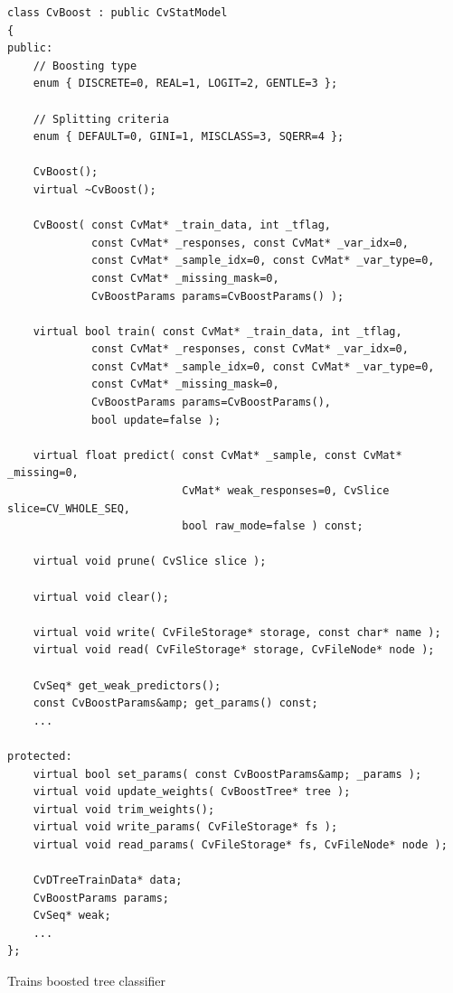 \begin{lstlisting}
class CvBoost : public CvStatModel
{
public:
    // Boosting type
    enum { DISCRETE=0, REAL=1, LOGIT=2, GENTLE=3 };

    // Splitting criteria
    enum { DEFAULT=0, GINI=1, MISCLASS=3, SQERR=4 };

    CvBoost();
    virtual ~CvBoost();

    CvBoost( const CvMat* _train_data, int _tflag,
             const CvMat* _responses, const CvMat* _var_idx=0,
             const CvMat* _sample_idx=0, const CvMat* _var_type=0,
             const CvMat* _missing_mask=0,
             CvBoostParams params=CvBoostParams() );

    virtual bool train( const CvMat* _train_data, int _tflag,
             const CvMat* _responses, const CvMat* _var_idx=0,
             const CvMat* _sample_idx=0, const CvMat* _var_type=0,
             const CvMat* _missing_mask=0,
             CvBoostParams params=CvBoostParams(),
             bool update=false );

    virtual float predict( const CvMat* _sample, const CvMat* _missing=0,
                           CvMat* weak_responses=0, CvSlice slice=CV_WHOLE_SEQ,
                           bool raw_mode=false ) const;

    virtual void prune( CvSlice slice );

    virtual void clear();

    virtual void write( CvFileStorage* storage, const char* name );
    virtual void read( CvFileStorage* storage, CvFileNode* node );

    CvSeq* get_weak_predictors();
    const CvBoostParams&amp; get_params() const;
    ...

protected:
    virtual bool set_params( const CvBoostParams&amp; _params );
    virtual void update_weights( CvBoostTree* tree );
    virtual void trim_weights();
    virtual void write_params( CvFileStorage* fs );
    virtual void read_params( CvFileStorage* fs, CvFileNode* node );

    CvDTreeTrainData* data;
    CvBoostParams params;
    CvSeq* weak;
    ...
};
\end{lstlisting}


Trains boosted tree classifier


